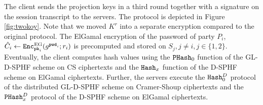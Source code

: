 The client sends the projection keys in a third round together with a signature on the session transcript to the servers.
The protocol is depicted in Figure \ref{fig:twokoy}.
Note that we moved $K^r$ into a separate encryption compared to the original protocol.
The ElGamal encryption of the password of party $P_i$, $\hat{C}_i\gets\mathtt{Enc}^\mathrm{EG}_{\mathtt{pk}_i}(g^{\mathtt{pwd}_i};r_i)$ is precomputed and stored on $S_{j},j\not=i,j\in\{1,2\}$.
Eventually, the client computes hash values using the $\mathtt{PHash}_0$ function of the GL-\ac{D-SPHF} scheme on CS ciphertexts and the $\mathtt{Hash}_x$ function of the \ac{D-SPHF} scheme on ElGamal ciphertexts.
Further, the servers execute the $\mathtt{Hash}_0^D$ protocol of the distributed GL-\ac{D-SPHF} scheme on Cramer-Shoup ciphertexts and the $\mathtt{PHash}_x^D$ protocol of the \ac{D-SPHF} scheme on ElGamal ciphertexts.


